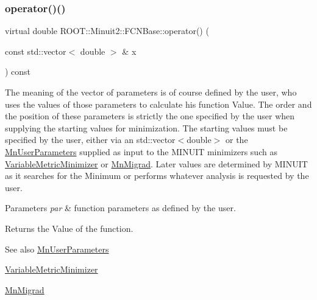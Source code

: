 \mbox{\label{classROOT_1_1Minuit2_1_1FCNBase_ae4a86bd94d0d0f5ca6fc8f8ab2bb43cd}} 
\subsubsection{\texorpdfstring{operator()()}{operator()()}\hspace{0.1cm}{\footnotesize\ttfamily [2/2]}}
{\footnotesize\ttfamily virtual double R\+O\+O\+T\+::\+Minuit2\+::\+F\+C\+N\+Base\+::operator() (\begin{DoxyParamCaption}\item[{const std\+::vector$<$ double $>$ \&}]{x }\end{DoxyParamCaption}) const\hspace{0.3cm}{\ttfamily [pure virtual]}}

The meaning of the vector of parameters is of course defined by the user, who uses the values of those parameters to calculate his function Value. The order and the position of these parameters is strictly the one specified by the user when supplying the starting values for minimization. The starting values must be specified by the user, either via an std\+::vector$<$double$>$ or the \mbox{\hyperlink{classROOT_1_1Minuit2_1_1MnUserParameters}{Mn\+User\+Parameters}} supplied as input to the M\+I\+N\+U\+IT minimizers such as \mbox{\hyperlink{classROOT_1_1Minuit2_1_1VariableMetricMinimizer}{Variable\+Metric\+Minimizer}} or \mbox{\hyperlink{classROOT_1_1Minuit2_1_1MnMigrad}{Mn\+Migrad}}. Later values are determined by M\+I\+N\+U\+IT as it searches for the Minimum or performs whatever analysis is requested by the user.


\begin{DoxyParams}{Parameters}
{\em par} & function parameters as defined by the user.\\
\hline
\end{DoxyParams}
\begin{DoxyReturn}{Returns}
the Value of the function.
\end{DoxyReturn}
\begin{DoxySeeAlso}{See also}
\mbox{\hyperlink{classROOT_1_1Minuit2_1_1MnUserParameters}{Mn\+User\+Parameters}} 

\mbox{\hyperlink{classROOT_1_1Minuit2_1_1VariableMetricMinimizer}{Variable\+Metric\+Minimizer}} 

\mbox{\hyperlink{classROOT_1_1Minuit2_1_1MnMigrad}{Mn\+Migrad}} 
\end{DoxySeeAlso}



